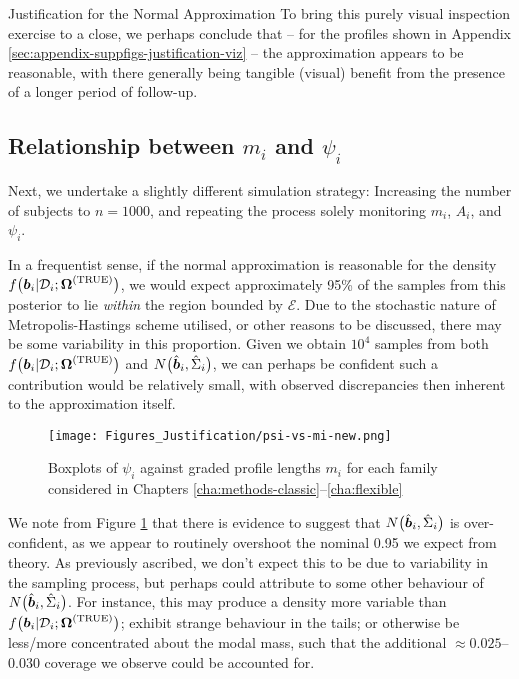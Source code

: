 \begin{chapter}{\label{cha:justification}Justification for the Normal Approximation}
  To bring this purely visual inspection exercise to a close, we perhaps conclude that -- for the profiles shown in Appendix \ref{sec:appendix-suppfigs-justification-viz} -- the approximation appears to be reasonable, with there generally being tangible (visual) benefit from the presence of a longer period of follow-up.
  
  \subsection{Relationship between \texorpdfstring{$m_i$}{mi} and \texorpdfstring{$\psi_i$}{psi}}\label{sec:justification-results-psi}
  Next, we undertake a slightly different simulation strategy: Increasing the number of subjects to $n=1000$, and repeating the process solely monitoring $m_i$, $A_i$, and $\psi_i$. 
  
  In a frequentist sense, if the normal approximation is reasonable for the density $f\big(\bm{b}_i|\mathcal{D}_i;\bm{\mathrm{\Omega}}^{(\mathrm{TRUE})}\big)$, we would expect approximately 95\% of the samples from this posterior to lie \textit{within} the region bounded by $\mathcal{E}$. Due to the stochastic nature of Metropolis-Hastings scheme utilised, or other reasons to be discussed, there may be some variability in this proportion. Given we obtain $10^4$ samples from both $f\big(\bm{b}_i|\mathcal{D}_i;\bm{\mathrm{\Omega}}^{(\mathrm{TRUE})}\big)$ and $N\big(\hat{\bm{b}}_i,\hat{\Sigma}_i\big)$, we can perhaps be confident such a contribution would be relatively small, with observed discrepancies then inherent to the approximation itself.

  \begin{figure}[th]
      \centering
      \texttt{[image: Figures\_Justification/psi-vs-mi-new.png]}
      \caption{Boxplots of $\psi_i$ against graded profile lengths $m_i$ for each family considered in Chapters \ref{cha:methods-classic}--\ref{cha:flexible}}
      \label{fig:justification-psi-mi-families}
  \end{figure}
  
  We note from Figure \ref{fig:justification-psi-mi-families} that there is evidence to suggest that $N\big(\hat{\bm{b}}_i,\hat{\Sigma}_i\big)$ is over-confident, as we appear to routinely overshoot the nominal 0.95 we expect from theory. As previously ascribed, we don't expect this to be due to variability in the sampling process, but perhaps could attribute to some other behaviour of $N\big(\hat{\bm{b}}_i,\hat{\Sigma}_i\big)$. For instance, this may produce a density more variable than $f\big(\bm{b}_i|\mathcal{D}_i;\bm{\mathrm{\Omega}}^{(\mathrm{TRUE})}\big)$; exhibit strange behaviour in the tails; or otherwise be less/more concentrated about the modal mass, such that the additional $\approx0.025$--$0.030$ coverage we observe could be accounted for. 


\end{chapter}
